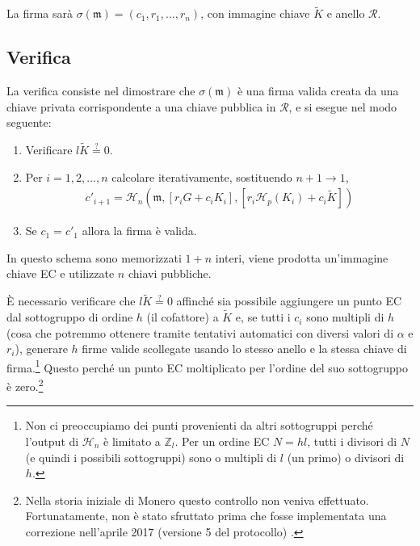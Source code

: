 La firma sarà \(\sigma(\mathfrak{m}) = (c_1, r_1, ..., r_n)\), con immagine chiave \(\tilde{K}\) e anello \(\mathcal{R}\).


\subsection*{Verifica}

La verifica consiste nel dimostrare che \(\sigma(\mathfrak{m})\) è una firma valida creata da una chiave privata corrispondente a una chiave pubblica in \(\mathcal{R}\), e si esegue nel modo seguente:

\begin{enumerate}
    \item Verificare \(l \tilde{K} \stackrel{?}{=} 0\).
	\item Per \(i = 1, 2, ..., n\) calcolare iterativamente, sostituendo \(n + 1 \rightarrow 1\),\vspace{.175cm}
	\begin{align*}
	c'_{i+1} = \mathcal{H}_n(\mathfrak{m}, [r_i G + c_i K_i], [r_i \mathcal{H}_p(K_i) + c_i \tilde{K}])
	\end{align*}

	\item Se \(c_1 = c'_1\) allora la firma è valida.
\end{enumerate}

In questo schema sono memorizzati \(1 + n\) interi, viene prodotta un'immagine chiave EC e utilizzate \(n\) chiavi pubbliche.

È necessario verificare che \(l \tilde{K} \stackrel{?}{=} 0\) affinché sia possibile aggiungere un punto EC dal sottogruppo di ordine \(h\) (il cofattore) a \(\tilde{K}\) e, se tutti i \(c_i\) sono multipli di \(h\) (cosa che potremmo ottenere tramite tentativi automatici con diversi valori di \(\alpha\) e \(r_i\)), generare \(h\) firme valide scollegate usando lo stesso anello e la stessa chiave di firma.\footnote{Non ci preoccupiamo dei punti provenienti da altri sottogruppi perché l'output di \(\mathcal{H}_n\) è limitato a \(\mathbb{Z}_l\). Per un ordine EC \(N = h l\), tutti i divisori di \(N\) (e quindi i possibili sottogruppi) sono o multipli di \(l\) (un primo) o divisori di \(h\).} Questo perché un punto EC moltiplicato per l'ordine del suo sottogruppo è zero.\footnote{Nella storia iniziale di Monero questo controllo non veniva effettuato. Fortunatamente, non è stato sfruttato prima che fosse implementata una correzione nell'aprile 2017 (versione 5 del protocollo) \cite{key-image-bug}.}

